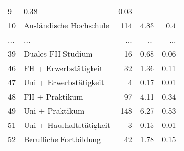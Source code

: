 \begin{longtable}{lXrrr}
          \num{9} &
          \num[round-mode=places,round-precision=2]{0,38} &
          \num[round-mode=places,round-precision=2]{0,03} \\
        10 & \multicolumn{1}{X}{Ausländische Hochschule} & %
          \num{114} &
          \num[round-mode=places,round-precision=2]{4,83} &
          \num[round-mode=places,round-precision=2]{0,4} \\
       ... & ... & ... & ... & ... \\
        39 & \multicolumn{1}{X}{Duales FH-Studium} & %
          \num{16} &
          \num[round-mode=places,round-precision=2]{0,68} &
          \num[round-mode=places,round-precision=2]{0,06} \\

        46 & \multicolumn{1}{X}{FH + Erwerbstätigkeit} & %
          \num{32} &
          \num[round-mode=places,round-precision=2]{1,36} &
          \num[round-mode=places,round-precision=2]{0,11} \\

        47 & \multicolumn{1}{X}{Uni + Erwerbstätigkeit} & %
          \num{4} &
          \num[round-mode=places,round-precision=2]{0,17} &
          \num[round-mode=places,round-precision=2]{0,01} \\

        48 & \multicolumn{1}{X}{FH + Praktikum} & %
          \num{97} &
          \num[round-mode=places,round-precision=2]{4,11} &
          \num[round-mode=places,round-precision=2]{0,34} \\

        49 & \multicolumn{1}{X}{Uni + Praktikum} & %
          \num{148} &
          \num[round-mode=places,round-precision=2]{6,27} &
          \num[round-mode=places,round-precision=2]{0,53} \\

        51 & \multicolumn{1}{X}{Uni + Haushaltstätigkeit} & %
          \num{3} &
          \num[round-mode=places,round-precision=2]{0,13} &
          \num[round-mode=places,round-precision=2]{0,01} \\

        52 & \multicolumn{1}{X}{Berufliche Fortbildung} & %
          \num{42} &
          \num[round-mode=places,round-precision=2]{1,78} &
          \num[round-mode=places,round-precision=2]{0,15} \\


\end{longtable}
